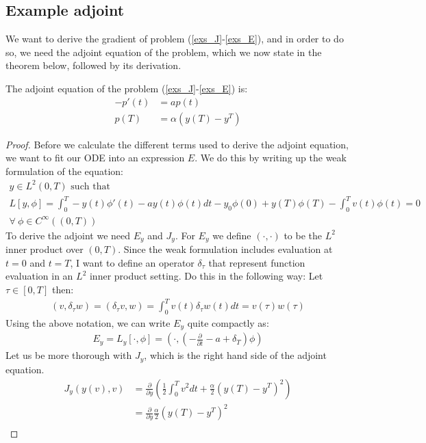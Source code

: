 \subsection{Example adjoint}
We want to derive the gradient of problem (\ref{exs_J}-\ref{exs_E}), and in order to do so, we need the adjoint equation of the problem, which we now state in the theorem below, followed by its derivation.
\begin{theorem}
The adjoint equation of the problem (\ref{exs_J}-\ref{exs_E}) is:
\begin{align}     
-p'(t) &= ap(t) \label{exs_adjoint_eq}\\
p(T) &= \alpha(y(T)-y^T)   \label{exs_adjoint_ic}  
\end{align}
\end{theorem}
\begin{proof}
Before we calculate the different terms used to derive the adjoint equation, we want to fit our ODE into an expression $E$. We do this by writing up the weak formulation of the equation:
\begin{gather*}
\textrm{$y \in L^2(0,T)$ such that}\\
L[y,\phi] = \int_0^T-y(t)\phi'(t)-ay(t)\phi(t)dt -y_0\phi(0)+y(T)\phi(T)-\int_0^Tv(t)\phi(t)=0\\ \forall \ \phi \in C^{\infty}((0,T))
\end{gather*}
To derive the adjoint we need $E_y$ and $J_y$. For $E_y$ we define $(\cdot,\cdot)$ to be the $L^2$ inner product over $(0,T)$. Since the weak formulation includes evaluation at $t=0$ and $t=T$, I want to define an operator $\delta_{\tau}$ that represent function evaluation in an $L^2$ inner product setting. Do this in the following way: Let $\tau \in [0,T]$ then:
\begin{align*}
(v,\delta_{\tau}w) =(\delta_{\tau}v,w) = \int_0^Tv(t)\delta_{\tau}w(t)dt = v(\tau)w(\tau)
\end{align*}
Using the above notation, we can write $E_y$ quite compactly as:
\begin{align*}
E_y=L_y[\cdot,\phi]=(\cdot,(-\frac{\partial}{\partial t} - a + \delta_T)\phi)  
\end{align*}
Let us be more thorough with $J_y$, which is the right hand side of the adjoint equation.
\begin{align*}
J_y(y(v),v) &= \frac{\partial}{\partial y}(\frac{1}{2}\int_0^Tv^2dt + \frac{\alpha}{2}(y(T)-y^T)^2) \\ &= \frac{\partial}{\partial y} \frac{\alpha}{2}(y(T)-y^T)^2 \\

\end{align*}
\end{proof}
